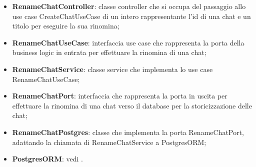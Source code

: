 \documentclass[10pt, a4paper]{article}
\begin{document}
\begin{itemize}
    \item \label{RenameChatController}\textbf{RenameChatController}: classe controller che si occupa del passaggio allo use case CreateChatUseCase di un intero rappresentante l'id di una chat e un titolo per eseguire la sua rinomina;
    \item \label{RenameChatUseCase}\textbf{RenameChatUseCase}: interfaccia use case che rappresenta la porta della business logic in entrata per effettuare la rinomina di una chat;
    \item \label{RenameChatService}\textbf{RenameChatService}: classe service che implementa lo use case RenameChatUseCase;
    \item \label{RenameChatPort}\textbf{RenameChatPort}: interfaccia che rappresenta la porta in uscita per effettuare la rinomina di una chat verso il database per la storicizzazione delle chat;
    \item \label{RenameChatPostgres}\textbf{RenameChatPostgres}: classe che implementa la porta RenameChatPort, adattando la chiamata di RenameChatService a PostgresORM;
    \item \textbf{PostgresORM}: vedi . 
\end{itemize}
\end{document}
